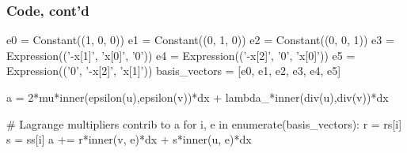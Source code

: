 \begin{frame}[fragile]
\frametitle{Code, cont'd}
\begin{python}
e0 = Constant((1, 0, 0))	
e1 = Constant((0, 1, 0))
e2 = Constant((0, 0, 1))
e3 = Expression(('-x[1]', 'x[0]', '0')) 
e4 = Expression(('-x[2]', '0', 'x[0]'))
e5 = Expression(('0', '-x[2]', 'x[1]'))
basis_vectors = [e0, e1, e2, e3, e4, e5]

a = 2*mu*inner(epsilon(u),epsilon(v))*dx + lambda_*inner(div(u),div(v))*dx

# Lagrange multipliers contrib to a
for i, e in enumerate(basis_vectors):
	r = rs[i]
	s = ss[i]
	a += r*inner(v, e)*dx + s*inner(u, e)*dx

\end{python}
\end{frame}

